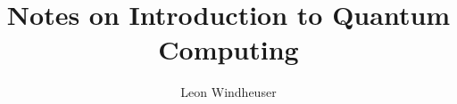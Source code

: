 \documentclass[12pt, a4paper]{article}
\begin{document}
\title{Notes on Introduction to Quantum Computing}
\author{Leon Windheuser}

\maketitle



\end{document}
